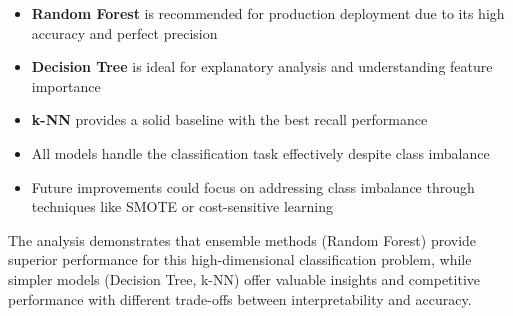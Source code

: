 \begin{itemize}
    \item \textbf{Random Forest} is recommended for production deployment due to its high accuracy and perfect precision
    \item \textbf{Decision Tree} is ideal for explanatory analysis and understanding feature importance
    \item \textbf{k-NN} provides a solid baseline with the best recall performance
    \item All models handle the classification task effectively despite class imbalance
    \item Future improvements could focus on addressing class imbalance through techniques like SMOTE or cost-sensitive learning
\end{itemize}

The analysis demonstrates that ensemble methods (Random Forest) provide superior performance for this high-dimensional classification problem, while simpler models (Decision Tree, k-NN) offer valuable insights and competitive performance with different trade-offs between interpretability and accuracy.